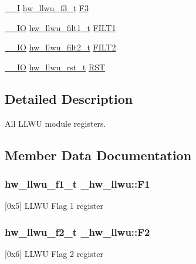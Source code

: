 \begin{DoxyCompactItemize}
\item 
\hyperlink{core__sc300_8h_af63697ed9952cc71e1225efe205f6cd3}{\+\_\+\+\_\+I} \hyperlink{union__hw__llwu__f3}{hw\+\_\+llwu\+\_\+f3\+\_\+t} \hyperlink{struct__hw__llwu_a2995519e3e570ce0e7dd4dc8c9cf09f8}{F3}
\item 
\hyperlink{core__sc300_8h_aec43007d9998a0a0e01faede4133d6be}{\+\_\+\+\_\+\+IO} \hyperlink{union__hw__llwu__filt1}{hw\+\_\+llwu\+\_\+filt1\+\_\+t} \hyperlink{struct__hw__llwu_a5836bdd72737ae9f62d0ef81ff0409a0}{F\+I\+L\+T1}
\item 
\hyperlink{core__sc300_8h_aec43007d9998a0a0e01faede4133d6be}{\+\_\+\+\_\+\+IO} \hyperlink{union__hw__llwu__filt2}{hw\+\_\+llwu\+\_\+filt2\+\_\+t} \hyperlink{struct__hw__llwu_ac3e9a2961f137ca9b99f64cc2ff27a58}{F\+I\+L\+T2}
\item 
\hyperlink{core__sc300_8h_aec43007d9998a0a0e01faede4133d6be}{\+\_\+\+\_\+\+IO} \hyperlink{union__hw__llwu__rst}{hw\+\_\+llwu\+\_\+rst\+\_\+t} \hyperlink{struct__hw__llwu_a59e2cbe447901fec76eb71487e74b888}{R\+ST}
\end{DoxyCompactItemize}


\subsection{Detailed Description}
All L\+L\+WU module registers. 

\subsection{Member Data Documentation}
\subsubsection[{\texorpdfstring{F1}{F1}}]{ {\bf hw\+\_\+llwu\+\_\+f1\+\_\+t} \+\_\+hw\+\_\+llwu\+::\+F1}\hypertarget{struct__hw__llwu_a21025fca0fce838798ca5595769de593}{}\label{struct__hw__llwu_a21025fca0fce838798ca5595769de593}
\mbox{[}0x5\mbox{]} L\+L\+WU Flag 1 register 
\subsubsection[{\texorpdfstring{F2}{F2}}]{ {\bf hw\+\_\+llwu\+\_\+f2\+\_\+t} \+\_\+hw\+\_\+llwu\+::\+F2}\hypertarget{struct__hw__llwu_ab16169cedbd4f447c4e970b57db3991c}{}\label{struct__hw__llwu_ab16169cedbd4f447c4e970b57db3991c}
\mbox{[}0x6\mbox{]} L\+L\+WU Flag 2 register 

